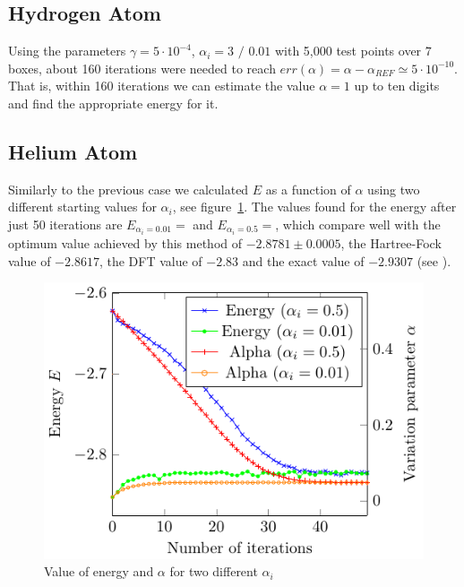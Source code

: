\subsection{Hydrogen Atom}
Using the parameters
$\gamma = 5\cdot 10^{-4}$, $\alpha_i = 3 \text{~/~}0.01$ with 5,000
test points over $7$ boxes, about 160 iterations were needed to reach
$err(\alpha) = \alpha-\alpha_{REF} \simeq 5 \cdot 10^{-10}$. That is, within 160
iterations we can estimate the value $\alpha=1$ up to ten digits and find the appropriate energy for it.


\subsection{Helium Atom}

Similarly to the previous case we calculated $E$ as a function of $\alpha$
using two different starting values for $\alpha_i$, see figure~\ref{fig:He_it}.
The values found for the energy after just 50 iterations are
$E_{\alpha_i = 0.01} =  $ and $E_{\alpha_i = 0.5} =  $, which
compare well with the optimum value achieved by this method
of $-2.8781 \pm 0.0005$, the Hartree-Fock value of $-2.8617$,
the DFT value of $-2.83$ and the exact value of $-2.9307$ (see \cite{JosBook}). %

\begin{figure}[th]
  \begin{center}
  \includegraphics[scale=1 ]{graphs/he-e-alpha-iterations.pdf}
  \caption{
	Value of energy and $\alpha$ for two different $\alpha_i$
  	}
  \label{fig:He_it}
  \end{center}
\end{figure}
